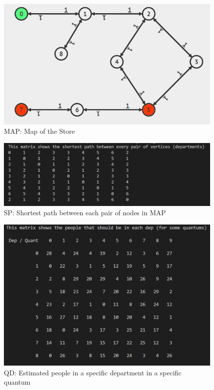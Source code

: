 \documentclass[a4paper, 12pt, oneside, table]{article}
\begin{document}
\begin{figure}[H]
\centering
	\centering
  	\includegraphics[height=0.4\textheight, scale=0.2, keepaspectratio]{img/alg_map_man/store_graph.JPG}
	\caption{MAP: Map of the Store}
 	\label{storeGraph}
\end{figure}
\begin{figure}[H]
\centering
	\centering
  	\includegraphics[height=0.2\textheight, scale=0.1, keepaspectratio]{img/alg_map_man/warshall_matr.JPG}
	\caption{SP: Shortest path between each pair of nodes in MAP}
 	\label{warshall}
\end{figure}
\begin{figure}[H]
\centering
	\centering
  	\includegraphics[height=0.4\textheight, scale=0.2, keepaspectratio]{img/alg_map_man/dep_quant_mat.JPG}
	\caption{QD: Estimated people in a specific department in a specific quantum}
 	\label{qd}
\end{figure}
\end{document}
